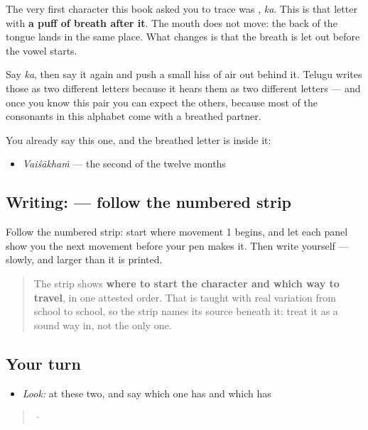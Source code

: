 The very first character this book asked you to trace was \textbf{}, \emph{ka}. This is that letter with \textbf{a puff of breath after it}. The mouth does not move: the back of the tongue lands in the same place. What changes is that the breath is let out before the vowel starts.

Say \emph{ka}, then say it again and push a small hiss of air out behind it. Telugu writes those as two different letters because it hears them as two different letters — and once you know this pair you can expect the others, because most of the consonants in this alphabet come with a breathed partner.

You already say this one, and the breathed letter is inside it:

\begin{itemize}
\raggedright
  \item \textbf{} \emph{Vaiśākhaṁ} — the second of the twelve months
\end{itemize}

\subsection*{Writing:  — follow the numbered strip}

Follow the numbered strip: start where movement 1 begins, and let each panel show you the next movement before your pen makes it. Then write  yourself — slowly, and larger than it is printed.

\begin{quote}
The strip shows \textbf{where to start the character and which way to travel}, in one attested order. That is taught with real variation from school to school, so the strip names its source beneath it: treat it as a sound way in, not the only one.
\end{quote}

\subsection*{Your turn}
\begin{itemize}
\raggedright
  \item \emph{Look:} at these two, and say which one has  and which has 
\end{itemize}

\begin{quote}
  ·  
\end{quote}

